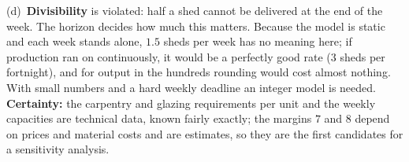 \begin{solutions}
        (d)~\textbf{Divisibility} is violated: half a shed cannot be
        delivered at the end of the week. The horizon decides how much
        this matters. Because the model is static and each week stands
        alone, $1.5$ sheds per week has no meaning here; if production ran
        on continuously, it would be a perfectly good rate ($3$ sheds per
        fortnight), and for output in the hundreds rounding would cost
        almost nothing. With small numbers and a hard weekly deadline an
        integer model is needed. \textbf{Certainty:} the carpentry and
        glazing requirements per unit and the weekly capacities are
        technical data, known fairly exactly; the margins $7$ and $8$
        depend on prices and material costs and are estimates, so they
        are the first candidates for a sensitivity analysis.
\end{solutions}
